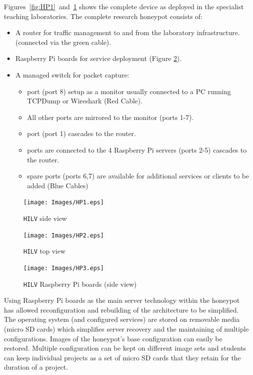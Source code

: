 Figures~\ref{fig:HP1}~and~\ref{fig:HP2} shows the complete device as deployed in the specialist teaching laboratories. The complete research honeypot consists of:

\begin{itemize}
\item \noindent A router for traffic management to and from the laboratory infrastructure. (connected via the green cable).
\item {} Raspberry Pi boards for service deployment (Figure \ref{fig:HP3}).
\item \noindent A managed switch for packet capture:
\begin{itemize}
	\item {} port (port 8) setup as a monitor usually connected to a PC running TCPDump or Wireshark (Red Cable).
	\item \noindent All other ports are mirrored to the monitor (ports 1-7). 
	\item {} port (port 1) cascades to the router. 
	\item {} ports are connected to the 4 Raspberry Pi servers (ports 2-5) cascades to the router. 
	\item {} spare ports (ports 6,7) are available for additional services or clients to be added (Blue Cables)
\end{itemize}
\end{itemize}

\begin{figure}[!ht]
  \centering
  \begin{minipage}[h]{0.45\textwidth}
    \texttt{[image: Images/HP1.eps]}
    \caption{\texttt{HILV} side view}
    \label{fig:HP1}
  \end{minipage}
  \hfill
  \begin{minipage}[h]{0.45\textwidth}
    \texttt{[image: Images/HP2.eps]}
    \caption{\texttt{HILV} top view}
    \label{fig:HP2}
  \end{minipage}
\end{figure}

\begin{figure}[htb]
\begin{center}
	\texttt{[image: Images/HP3.eps]}
\caption{\texttt{HILV} Raspberry Pi boards (side view)}
\label{fig:HP3}
\end{center}
\end{figure}

Using Raspberry Pi boards as the main server technology within the honeypot has allowed reconfiguration and rebuilding of the architecture to be simplified. The operating system (and configured services) are stored on removable media (micro SD cards) which simplifies server recovery and the maintaining of multiple configurations. Images of the honeypot's base configuration can easily be restored. Multiple configuration can be kept on different image sets and students can keep individual projects as a set of micro SD cards that they retain for the duration of a project.

